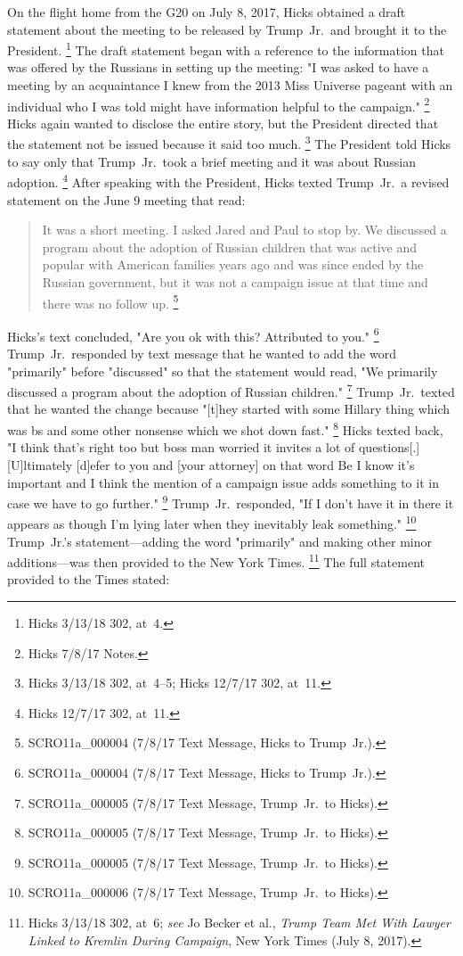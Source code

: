 {On the flight home from the G20 on July 8, 2017, Hicks obtained a draft statement about the meeting to be released by Trump~Jr.\ and brought it to the President.%
\footnote{Hicks 3/13/18 302, at~4.}
The draft statement began with a reference to the information that was offered by the Russians in setting up the meeting: "I was asked to have a meeting by an acquaintance I knew from the 2013 Miss Universe pageant with an individual who I was told might have information helpful to the campaign."%
\footnote{Hicks 7/8/17 Notes.}
Hicks again wanted to disclose the entire story, but the President directed that the statement not be
issued because it said too much.%
\footnote{Hicks 3/13/18 302, at~4--5;
Hicks 12/7/17 302, at~11.}
The President told Hicks to say only that Trump~Jr.\ took a brief meeting and it was about Russian adoption.%
\footnote{Hicks 12/7/17 302, at~11.}
After speaking with the President, Hicks texted Trump~Jr.\ a revised statement on the June 9 meeting that read:

\begin{quote}
It was a short meeting.
I asked Jared and Paul to stop by.
We discussed a program about the adoption of Russian children that was active and popular with American families years ago and was since ended by the Russian government, but it was not a campaign issue at that time and there was no follow up.%
\footnote{SCRO11a\_000004 (7/8/17 Text Message, Hicks to Trump~Jr.).}
\end{quote}

Hicks's text concluded, "Are you ok with this? Attributed to you."%
\footnote{SCRO11a\_000004 (7/8/17 Text Message, Hicks to Trump~Jr.).}
Trump~Jr.\ responded by text message that he wanted to add the word "primarily" before "discussed" so that the statement would read, "We primarily discussed a program about the adoption of Russian children."%
\footnote{SCRO11a\_000005 (7/8/17 Text Message, Trump~Jr.\ to Hicks).}
Trump~Jr.\ texted that he wanted the change because "[t]hey started with some Hillary thing which was bs and some other nonsense which we shot down fast."%
\footnote{SCRO11a\_000005 (7/8/17 Text Message, Trump~Jr.\ to Hicks).}
Hicks texted back, "I think that's right too but boss man worried it invites a lot of questions[.]
[U]ltimately [d]efer to you and [your attorney] on that word Be I know it's important and I think the mention of a campaign issue adds something to it in case we have to go further."%
\footnote{SCRO11a\_000005 (7/8/17 Text Message, Trump~Jr.\ to Hicks).}
Trump~Jr.\ responded, "If I don't have it in there it appears as though I'm lying later when they inevitably leak something."%
\footnote{SCRO11a\_000006 (7/8/17 Text Message, Trump~Jr.\ to Hicks).}
Trump~Jr.'s statement---adding the word "primarily" and making other minor additions---was then provided to the New York Times.%
\footnote{Hicks 3/13/18 302, at~6;
\textit{see} Jo Becker et al., \textit{Trump Team Met With Lawyer Linked to Kremlin During Campaign}, New York Times (July 8, 2017).}
The full statement provided to the Times stated:

}
